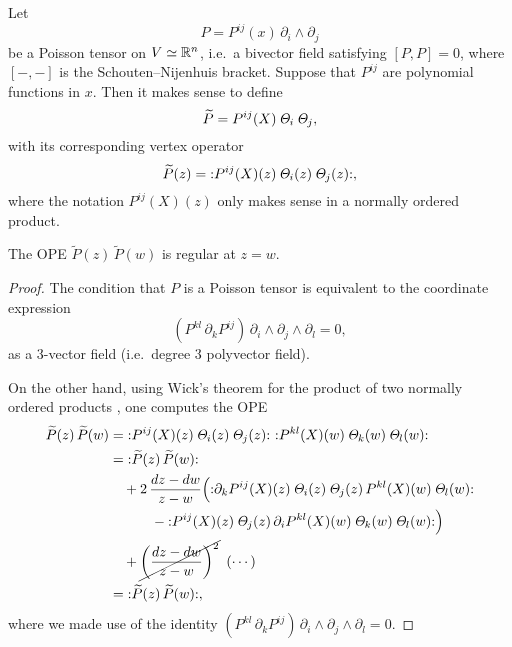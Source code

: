 Let
\[
    P = P^{ij} (x) \, \partial_i \wedge \partial_j
\]
be a Poisson tensor on $V \simeq \mathbb{R}^n$,
i.e.\ a bivector field satisfying $[P, P] = 0$,
where $[-, -]$ is the Schouten--Nijenhuis bracket.
Suppose that $P^{ij}$ are polynomial functions in $x$.
Then it makes sense to define
\[
    \widetilde{P} = P^{ij} (X) \, \mathit{\Theta}_i \, \mathit{\Theta}_j ,
\]
with its corresponding vertex operator
\[
    \widetilde{P} (z) =
    \mathopen{:} P^{ij} (X) (z) \, \mathit{\Theta}_i (z) \, \mathit{\Theta}_j (z) \mathclose{:},
\]
where the notation $P^{ij} (X) (z)$
only makes sense in a normally ordered product.

\begin{proposition}
    \label{prop-poisson}
    The OPE $\widetilde{P} (z) \, \widetilde{P} (w)$
    is regular at $z = w$.
\end{proposition}

\begin{proof}
    \allowdisplaybreaks
    The condition that $P$ is a Poisson tensor
    is equivalent to the coordinate expression
    \[
        (P^{kl} \, \partial_k P^{ij}) \,
        \partial_i \wedge \partial_j \wedge \partial_l = 0,
    \]
    as a $3$-vector field
    (i.e.\ degree $3$ polyvector field).
    
    On the other hand, 
    using Wick's theorem
    for the product of two normally ordered products
    \cite[Theorem~3.3]{kac},
    one computes the OPE
    \begin{align*}
        \widetilde{P} (z) \, \widetilde{P} (w)
        & = \nord{ P^{ij} (X) (z) \, \itTheta_i (z) \, \itTheta_j (z) } \ 
        \nord{ P^{kl} (X) (w) \, \itTheta_k (w) \, \itTheta_l (w) } \\
        & =
        \nord{ \widetilde{P} (z) \, \widetilde{P} (w) } \\
        & \quad {} + 2 \, \frac{d z - d w}{z - w} \Bigl(
        \nord{ \partial_k P^{ij} (X) (z) \, \itTheta_i (z) \, \itTheta_j (z) \,
        P^{kl} (X) (w) \, \itTheta_l (w) } \\
        & \quad \qquad {} -
        \nord{ P^{ij} (X) (z) \, \itTheta_j (z) \,
        \partial_i P^{kl} (X) (w) \, \itTheta_k (w) \, \itTheta_l (w) }
        \Bigr) \\
        & \quad {} + \cancel {\biggl( \frac{d z - d w}{z - w} \biggr)^2} \enspace
        ( \cdots ) \\
        & = 
        \nord{ \widetilde{P} (z) \, \widetilde{P} (w) },
    \end{align*}
    where we made use of the identity 
    $(P^{kl} \, \partial_k P^{ij}) \,
    \partial_i \wedge \partial_j \wedge \partial_l = 0$.
\end{proof}

